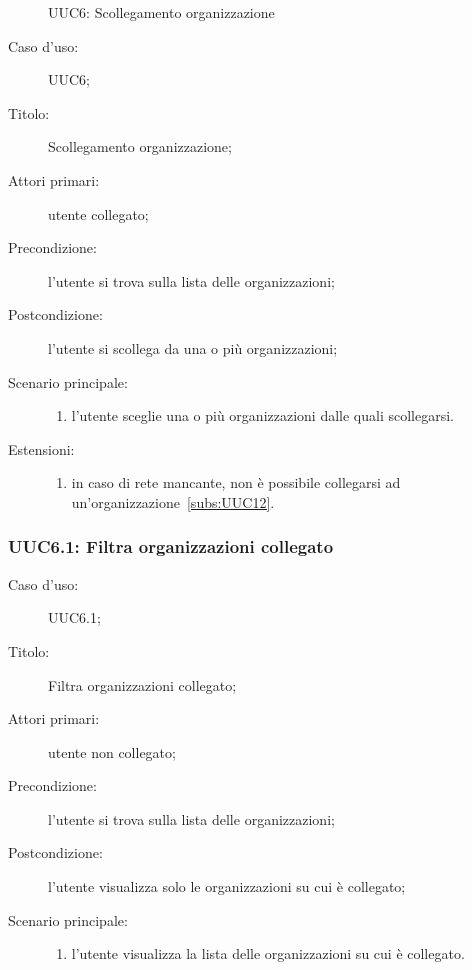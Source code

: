 \documentclass[../../../analisi-dei-requisiti.tex]{subfiles}
\begin{document}
\begin{figure}[H]
  \centering
  \caption{UUC6: Scollegamento organizzazione}%
  \label{fig:UUC12}
\end{figure}

\begin{description}
  \item[Caso d’uso:] UUC6;
  \item[Titolo:] Scollegamento organizzazione;
  \item[Attori primari:] utente collegato;
  \item[Precondizione:] l'utente si trova sulla lista delle organizzazioni;
  \item[Postcondizione:] l'utente si scollega da una o più organizzazioni;
  \item[Scenario principale:]
        \begin{enumerate}
          \item l'utente sceglie una o più organizzazioni dalle quali scollegarsi.
        \end{enumerate}
  \item[Estensioni:]
        \begin{enumerate}
          \item in caso di rete mancante, non è possibile collegarsi ad un'organizzazione~\ref{subs:UUC12}.
        \end{enumerate}
\end{description}


\subsubsection{UUC6.1: Filtra organizzazioni collegato}%
\begin{description}
  \item[Caso d’uso:] UUC6.1;
  \item[Titolo:] Filtra organizzazioni collegato;
  \item[Attori primari:] utente non collegato;
  \item[Precondizione:] l'utente si trova sulla lista delle organizzazioni;
  \item[Postcondizione:] l'utente visualizza solo le organizzazioni su cui è collegato;
  \item[Scenario principale:]
        \begin{enumerate}
          \item l'utente visualizza la lista delle organizzazioni su cui è collegato.
        \end{enumerate}
\end{description}
\end{document}
